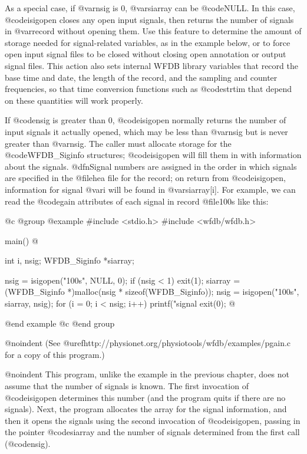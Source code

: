 {{{{{{{{As a special case, if @var{nsig} is 0, @var{siarray} can be @code{NULL}.
In this case, @code{isigopen} closes any open input signals, then
returns the number of signals in @var{record} without opening them.  Use
this feature to determine the amount of storage needed for
signal-related variables, as in the example below, or to force open
input signal files to be closed without closing open annotation or
output signal files.  This action also sets internal WFDB library
variables that record the base time and date, the length of the record,
and the sampling and counter frequencies, so that time conversion
functions such as @code{strtim} that depend on these quantities will
work properly.

If @code{nsig} is greater than 0, @code{isigopen} normally returns the
number of input signals it actually opened, which may be less than
@var{nsig} but is never greater than @var{nsig}.  The caller must
allocate storage for the @code{WFDB_Siginfo} structures; @code{isigopen}
will fill them in with information about the signals.  @dfn{Signal
numbers} are assigned in the order in which signals are specified in the
@file{hea} file for the record; on return from @code{isigopen},
information for signal @var{i} will be found in @var{siarray[i]}.  For
example, we can read the @code{gain} attributes of each signal in record
@file{100s} like this:

@c @group
@example
#include <stdio.h>
#include <wfdb/wfdb.h>

main()
@{
    int i, nsig;
    WFDB_Siginfo *siarray;

    nsig = isigopen("100s", NULL, 0);
    if (nsig < 1)
        exit(1);
    siarray = (WFDB_Siginfo *)malloc(nsig * sizeof(WFDB_Siginfo));
    nsig = isigopen("100s", siarray, nsig);
    for (i = 0; i < nsig; i++)
        printf("signal %
    exit(0);
@}
@end example
@c @end group

@noindent
(See @uref{http://physionet.org/physiotools/wfdb/examples/pgain.c}
for a copy of this program.)

@noindent
This program, unlike the example in the previous chapter, does not
assume that the number of signals is known.  The first invocation of
@code{isigopen} determines this number (and the program quits if there
are no signals).  Next, the program allocates the array for the signal
information, and then it opens the signals using the second
invocation of @code{isigopen}, passing in the pointer @code{siarray} and the
number of signals determined from the first call (@code{nsig}).

}}}}}}}}
